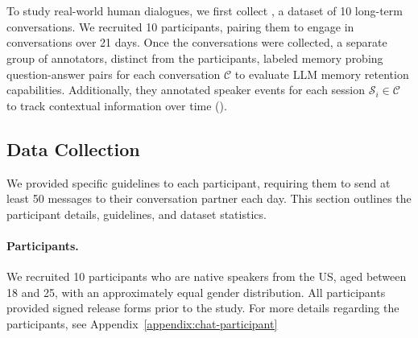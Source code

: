 \section{\dataset{}}
\label{ssec:data}

To study real-world human dialogues, we first collect \dataset{}, a dataset of 10 long-term conversations. 
We recruited 10 participants, pairing them to engage in conversations over 21 days.
Once the conversations were collected, a separate group of annotators, distinct from the participants, labeled memory probing question-answer pairs for each conversation $\mathcal{C}$ to evaluate LLM memory retention capabilities. 
Additionally, they annotated speaker events for each session $\mathcal{S}_i \in \mathcal{C}$ to track contextual information over time ().

\subsection{Data Collection}
\label{ssec:data-collection}
We provided specific guidelines to each participant, requiring them to send at least 50 messages to their conversation partner each day.
This section outlines the participant details, guidelines, and dataset statistics.

\paragraph{Participants.}
We recruited 10 participants who are native speakers from the US, aged between 18 and 25, with an approximately equal gender distribution. 
All participants provided signed release forms prior to the study.
For more details regarding the participants, see Appendix~\ref{appendix:chat-participant}

